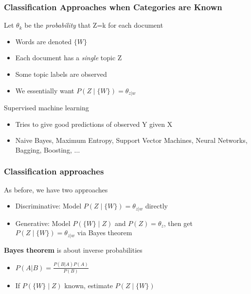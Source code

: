 \documentclass[11pt,compress,professionalfonts]{beamer}
\newcommand{\ita}{\begin{itemize}}
\newcommand{\itm}{\item[]}
\newcommand{\itz}{\end{itemize}}
\begin{document}
\begin{frame}[t,fragile]\frametitle{Classification Approaches when Categories are Known}

Let $\theta_k$ be the \textit{probability} that Z=k for each document
\ita
\itm Words are denoted $\{W\}$
\itm Each document has a \textit{single} topic Z
\itm Some topic labels are observed
\itm We essentially want $P(Z \mid \{W\}) = \theta_{z|w}$
\itz
\vfill
Supervised machine learning
\ita
\itm Tries to give good predictions of observed Y given X
\itm Naive Bayes, Maximum Entropy, Support Vector Machines, Neural Networks, Bagging, Boosting, $\ldots$
\itz
\end{frame}









\begin{frame}[t,fragile]\frametitle{Classification approaches}
As before, we have two approaches
\ita
\itm Discriminative: Model $P(Z \mid \{W\}) = \theta_{z|w}$ directly
\itm Generative: Model $P(\{W\} \mid Z)$ and $P(Z)=\theta_z$, then get $P(Z \mid \{W\}) = \theta_{z|w}$ via Bayes theorem
\itz
\vfill
\textbf{Bayes theorem} is about inverse probabilities
\ita
\itm $P(A | B) = \frac{P(B | A) P(A)}{P(B)}$
\itm If $P(\{W\} \mid Z)$ known, estimate $P(Z \mid \{W\} )$
\itz
\end{frame}
\end{document}
